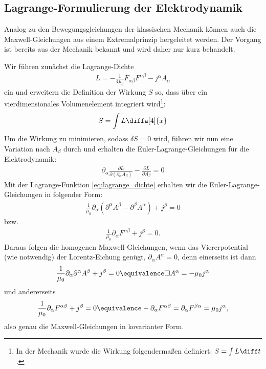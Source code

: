 \subsection{Lagrange-Formulierung der Elektrodynamik}

Analog zu den Bewegungsgleichungen der klassischen Mechanik können auch die Maxwell-Gleichungen aus einem Extremalprinzip hergeleitet werden. 
Der Vorgang ist bereits aus der Mechanik bekannt und wird daher nur kurz behandelt. 

Wir führen zunächst die Lagrange-Dichte 
\begin{align}
    \label{eq:lagrange_dichte}
    L=-\frac{1}{4\mu_0}F_{\alpha\beta} F^{\alpha\beta}-j^\alpha A_\alpha
\end{align}
ein und erweitern die Definition der Wirkung $S$ so, dass über ein vierdimensionales Volumenelement integriert wird\footnote{In der Mechanik wurde die Wirkung folgendermaßen definiert: $S=\int L\diff t$.}:
\begin{align*}
    S=\int L \diffa[4]{x}
\end{align*}
Um die Wirkung zu minimieren, sodass $\delta S=0$ wird, führen wir nun eine Variation nach $A_\beta$ durch und erhalten 
die Euler-Lagrange-Gleichungen für die Elektrodynamik:
\begin{align*}
    \boxed{\partial_\alpha \frac{\partial L}{\partial(\partial_\alpha A_\beta)}-\frac{\partial L}{\partial A_\beta}=0}
\end{align*}
Mit der Lagrange-Funktion \eqref{eq:lagrange_dichte} erhalten wir die Euler-Lagrange-Gleichungen in folgender Form:
\begin{align*}
    \boxed{\frac{1}{\mu_0}\partial_\alpha\left(\partial^\alpha A^\beta-\partial^\beta A^\alpha\right) + j^\beta=0}
\end{align*}
bzw. 
\begin{align*}
    \boxed{\frac{1}{\mu_0}\partial_\alpha F^{\alpha\beta} + j^\beta=0.}
\end{align*}
Daraus folgen die homogenen Maxwell-Gleichungen, wenn das Viererpotential (wie notwendig) der Lorentz-Eichung genügt, $\partial_\alpha A^\alpha=0$, denn einerseits ist dann
\begin{align*}
    \frac{1}{\mu_0}\partial_\alpha\partial^\alpha A^\beta + j^\beta=0 \equivalence \Box A^\alpha=-\mu_0 j^\alpha
\end{align*}
und andererseits 
\begin{align*}
    \frac{1}{\mu_0}\partial_\alpha F^{\alpha\beta} + j^\beta = 0 \equivalence -\partial_\alpha F^{\alpha\beta} = \partial_\alpha F^{\beta\alpha}=\mu_0 j^\alpha ,
\end{align*}
also genau die Maxwell-Gleichungen in kovarianter Form. 



